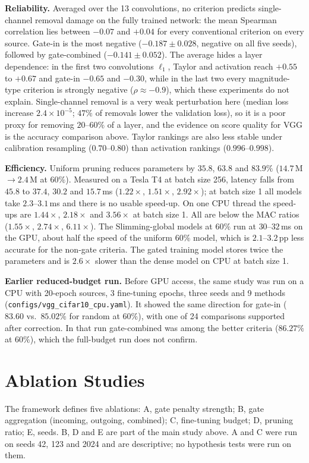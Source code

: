 

\textbf{Reliability.} Averaged over the 13 convolutions, no criterion predicts
single-channel removal damage on the fully trained network: the mean Spearman
correlation lies between $-0.07$ and $+0.04$ for every conventional criterion on every
source. Gate-in is the most negative ($-0.187\pm0.028$, negative on all five seeds),
followed by gate-combined ($-0.141\pm0.052$). The average hides a layer dependence: in the
first two convolutions $\ell_1$, Taylor and activation reach $+0.55$ to $+0.67$ and
gate-in $-0.65$ and $-0.30$, while in the last two every magnitude-type criterion is
strongly negative ($\rho\approx-0.9$), which these experiments do not explain.
Single-channel removal is a very weak perturbation here (median loss increase
$2.4\times10^{-5}$; $47\%$ of removals lower the validation loss), so it is a poor proxy
for removing $20$--$60\%$ of a layer, and the evidence on score quality for VGG is the
accuracy comparison above. Taylor rankings are also less stable under calibration
resampling ($0.70$--$0.80$) than activation rankings ($0.996$--$0.998$).

\textbf{Efficiency.} Uniform pruning reduces parameters by $35.8$, $63.8$ and $83.9\%$
($14.7$\,M$\to2.4$\,M at $60\%$). Measured on a Tesla T4 at batch size 256, latency falls
from $45.8$ to $37.4$, $30.2$ and $15.7$\,ms ($1.22\times$, $1.51\times$, $2.92\times$); at
batch size 1 all models take $2.3$--$3.1$\,ms and there is no usable speed-up. On one CPU
thread the speed-ups are $1.44\times$, $2.18\times$ and $3.56\times$ at batch size 1. All
are below the MAC ratios ($1.55\times$, $2.74\times$, $6.11\times$). The Slimming-global
models at $60\%$ run at $30$--$32$\,ms on the GPU, about half the speed of the uniform
$60\%$ model, which is $2.1$--$3.2$\,pp less accurate for the non-gate criteria. The gated
training model stores twice the parameters and is $2.6\times$ slower than the dense model
on CPU at batch size 1.

\textbf{Earlier reduced-budget run.} Before GPU access, the same study was run on a CPU
with 20-epoch sources, 3 fine-tuning epochs, three seeds and 9 methods
(\texttt{configs/vgg\_cifar10\_cpu.yaml}). It showed the same direction for gate-in
($83.60$ vs.\ $85.02\%$ for random at $60\%$), with one of 24 comparisons supported after
correction. In that run gate-combined was among the better criteria ($86.27\%$ at $60\%$),
which the full-budget run does not confirm.

\section{Ablation Studies}\label{sec:ablation}
The framework defines five ablations: A, gate penalty strength; B, gate aggregation
(incoming, outgoing, combined); C, fine-tuning budget; D, pruning ratio; E, seeds. B, D
and E are part of the main study above. A and C were run on seeds 42, 123 and 2024 and
are descriptive; no hypothesis tests were run on them.

